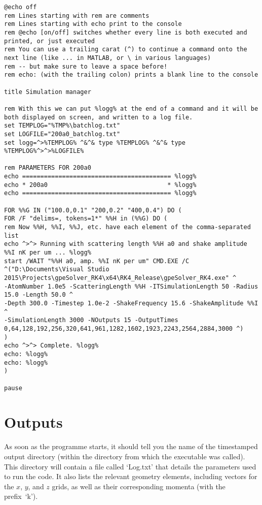 \documentclass{jakedoc}
\begin{document}
\lstset{language=command.com}
\begin{lstlisting}
@echo off
rem Lines starting with rem are comments
rem Lines starting with echo print to the console
rem @echo [on/off] switches whether every line is both executed and printed, or just executed
rem You can use a trailing carat (^) to continue a command onto the next line (like ... in MATLAB, or \ in various languages)
rem -- but make sure to leave a space before!
rem echo: (with the trailing colon) prints a blank line to the console

title Simulation manager

rem With this we can put %logg% at the end of a command and it will be both displayed on screen, and written to a log file.
set TEMPLOG="%TMP%\batchlog.txt"
set LOGFILE="200a0_batchlog.txt"
set logg=^>%TEMPLOG% ^&^& type %TEMPLOG% ^&^& type %TEMPLOG%^>^>%LOGFILE%

rem PARAMETERS FOR 200a0
echo ========================================= %logg%
echo * 200a0                                 * %logg%
echo ========================================= %logg%

FOR %%G IN ("100.0,0.1" "200,0.2" "400,0.4") DO (
FOR /F "delims=, tokens=1*" %%H in (%%G) DO (
rem Now %%H, %%I, %%J, etc. have each element of the comma-separated list
echo ^>^> Running with scattering length %%H a0 and shake amplitude %%I nK per um ... %logg%
start /WAIT "%%H a0, amp. %%I nK per um" CMD.EXE /C ^("D:\Documents\Visual Studio 2015\Projects\gpeSolver_RK4\x64\RK4_Release\gpeSolver_RK4.exe" ^
-AtomNumber 1.0e5 -ScatteringLength %%H -ITSimulationLength 50 -Radius 15.0 -Length 50.0 ^
-Depth 300.0 -Timestep 1.0e-2 -ShakeFrequency 15.6 -ShakeAmplitude %%I ^
-SimulationLength 3000 -NOutputs 15 -OutputTimes 0,64,128,192,256,320,641,961,1282,1602,1923,2243,2564,2884,3000 ^)
)
echo ^>^> Complete. %logg%
echo: %logg%
echo: %logg%
)

pause
\end{lstlisting}

\section{Outputs}

As soon as the programme starts, it should tell you the name of the timestamped output directory (within the directory from which the executable was called).
This directory will contain a file called `Log.txt' that details the parameters used to run the code. 
It also lists the relevant geometry elements, including vectors for the $x$, $y$, and $z$ grids, as well as their corresponding momenta (with the prefix~`k').\\
\end{document}
